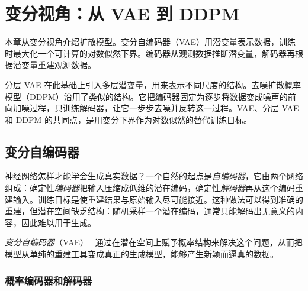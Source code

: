 \chapter{变分视角：从 VAE 到 DDPM}\label{ch:variational}


本章从变分视角介绍扩散模型。变分自编码器（VAE）用潜变量表示数据，训练时最大化一个可计算的对数似然下界。编码器从观测数据推断潜变量，解码器再根据潜变量重建观测数据。

分层 VAE 在此基础上引入多层潜变量，用来表示不同尺度的结构。去噪扩散概率模型（DDPM）沿用了类似的结构。它把编码器固定为逐步将数据变成噪声的前向加噪过程，只训练解码器，让它一步步去噪并反转这一过程。VAE、分层 VAE 和 DDPM 的共同点，是用变分下界作为对数似然的替代训练目标。



\section{变分自编码器}\label{sec:vae}
神经网络怎样才能学会生成真实数据？一个自然的起点是\emph{自编码器}，它由两个网络组成：确定性\emph{编码器}把输入压缩成低维的潜在编码，确定性\emph{解码器}再从这个编码重建输入。训练目标是使重建结果与原始输入尽可能接近。这种做法可以得到准确的重建，但潜在空间缺乏结构：随机采样一个潜在编码，通常只能解码出无意义的内容，因此难以用于生成。


\emph{变分自编码器}（VAE）~\citep{kingma2013auto} 通过在潜在空间上赋予概率结构来解决这个问题，从而把模型从单纯的重建工具变成真正的生成模型，能够产生新颖而逼真的数据。


\subsection{概率编码器和解码器}

